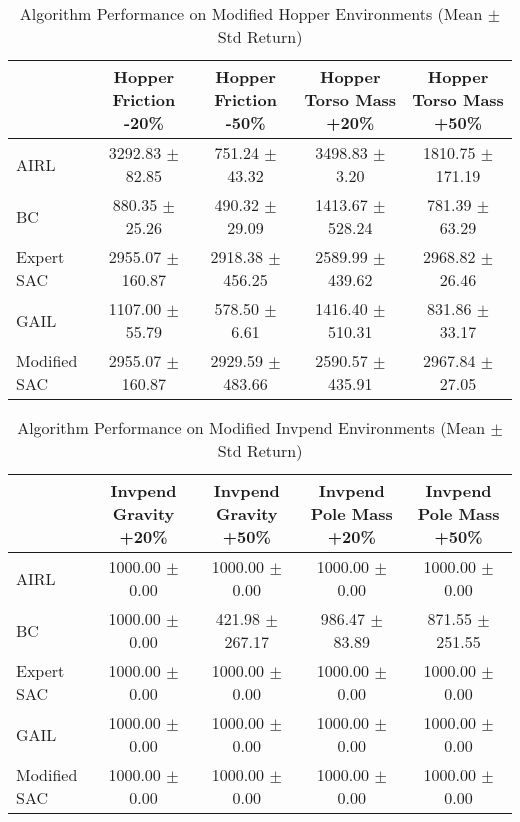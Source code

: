 
\begin{table}
\caption{Algorithm Performance on Modified Hopper Environments (Mean $\pm$ Std Return)}
\label{tab:perf_mod_hopper}
\begin{tabular}{lcccc}
\toprule
 & Hopper Friction -20\% & Hopper Friction -50\% & Hopper Torso Mass +20\% & Hopper Torso Mass +50\% \\
\midrule
AIRL & 3292.83 $\pm$ 82.85 & 751.24 $\pm$ 43.32 & 3498.83 $\pm$ 3.20 & 1810.75 $\pm$ 171.19 \\
BC & 880.35 $\pm$ 25.26 & 490.32 $\pm$ 29.09 & 1413.67 $\pm$ 528.24 & 781.39 $\pm$ 63.29 \\
Expert SAC & 2955.07 $\pm$ 160.87 & 2918.38 $\pm$ 456.25 & 2589.99 $\pm$ 439.62 & 2968.82 $\pm$ 26.46 \\
GAIL & 1107.00 $\pm$ 55.79 & 578.50 $\pm$ 6.61 & 1416.40 $\pm$ 510.31 & 831.86 $\pm$ 33.17 \\
Modified SAC & 2955.07 $\pm$ 160.87 & 2929.59 $\pm$ 483.66 & 2590.57 $\pm$ 435.91 & 2967.84 $\pm$ 27.05 \\
\bottomrule
\end{tabular}
\end{table}




\begin{table}
\caption{Algorithm Performance on Modified Invpend Environments (Mean $\pm$ Std Return)}
\label{tab:perf_mod_invpend}
\begin{tabular}{lcccc}
\toprule
 & Invpend Gravity +20\% & Invpend Gravity +50\% & Invpend Pole Mass +20\% & Invpend Pole Mass +50\% \\
\midrule
AIRL & 1000.00 $\pm$ 0.00 & 1000.00 $\pm$ 0.00 & 1000.00 $\pm$ 0.00 & 1000.00 $\pm$ 0.00 \\
BC & 1000.00 $\pm$ 0.00 & 421.98 $\pm$ 267.17 & 986.47 $\pm$ 83.89 & 871.55 $\pm$ 251.55 \\
Expert SAC & 1000.00 $\pm$ 0.00 & 1000.00 $\pm$ 0.00 & 1000.00 $\pm$ 0.00 & 1000.00 $\pm$ 0.00 \\
GAIL & 1000.00 $\pm$ 0.00 & 1000.00 $\pm$ 0.00 & 1000.00 $\pm$ 0.00 & 1000.00 $\pm$ 0.00 \\
Modified SAC & 1000.00 $\pm$ 0.00 & 1000.00 $\pm$ 0.00 & 1000.00 $\pm$ 0.00 & 1000.00 $\pm$ 0.00 \\
\bottomrule
\end{tabular}
\end{table}



